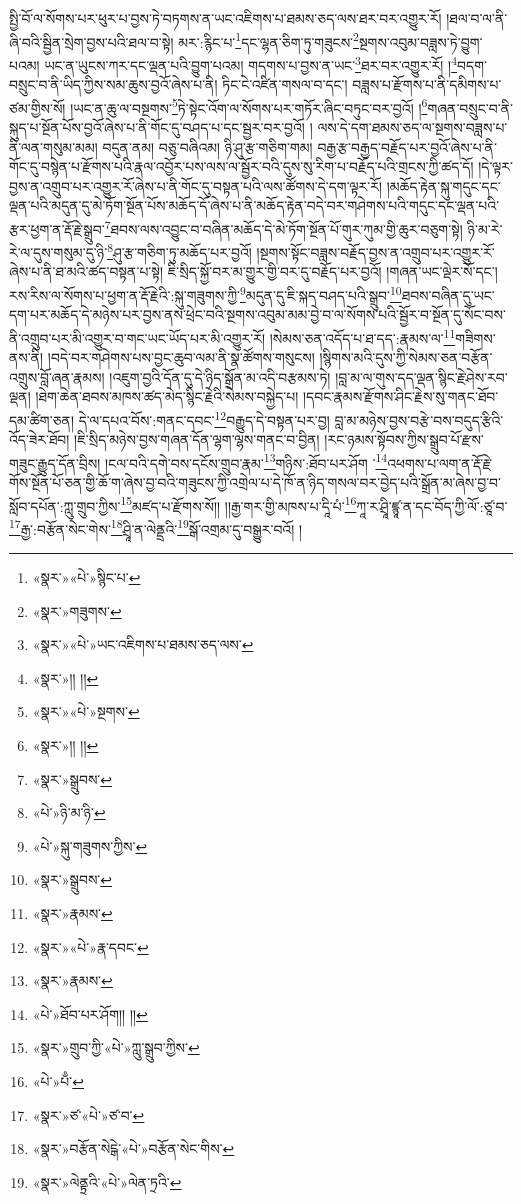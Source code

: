 སྤྱི་བོ་ལ་སོགས་པར་ཕུར་པ་བྱས་ཏེ་བཏགས་ན་ཡང་འཇིགས་པ་ཐམས་ཅད་ལས་ཐར་བར་འགྱུར་རོ། །ཐལ་བ་ལ་ནི་ཞི་བའི་སྦྱིན་སྲེག་བྱས་པའི་ཐལ་བ་སྟེ། མར་:རྙིང་པ་\footnote{«སྣར་»«པེ་»སྙིང་པ་}དང་ལྷན་ཅིག་ཏུ་གཟུངས་\footnote{«སྣར་»གཟུགས་}སྔགས་འབུམ་བཟླས་ཏེ་བྱུག་པའམ། ཡང་ན་ཡུངས་ཀར་དང་ལྡན་པའི་བྱུག་པའམ། གདགས་པ་བྱས་ན་ཡང་\footnote{«སྣར་»«པེ་»ཡང་འཇིགས་པ་ཐམས་ཅད་ལས་}ཐར་བར་འགྱུར་རོ། །\footnote{«སྣར་»།། །།}བདག་བསྲུང་བ་ནི་ཡིད་ཀྱིས་སམ་ཆུས་བྱའོ་ཞེས་པ་ནི། ཏིང་ངེ་འཛིན་གསལ་བ་དང་། བཟླས་པ་རྫོགས་པ་ནི་དམིགས་པ་ཙམ་གྱིས་སོ། །ཡང་ན་ཆུ་ལ་བསྔགས་\footnote{«སྣར་»«པེ་»སྔགས་}ཏེ་སྟེང་འོག་ལ་སོགས་པར་གཏོར་ཞིང་བཏུང་བར་བྱའོ། །\footnote{«སྣར་»།། །།}གཞན་བསྲུང་བ་ནི་སྐུད་པ་སྔོན་པོས་བྱའོ་ཞེས་པ་ནི་གོང་དུ་བཤད་པ་དང་སྦྱར་བར་བྱའོ། །
ལས་དེ་དག་ཐམས་ཅད་ལ་སྔགས་བཟླས་པ་ནི་ལན་གསུམ་མམ། བདུན་ནམ། བཅུ་བཞིའམ། ཉི་ཤུ་རྩ་གཅིག་གམ། བརྒྱ་རྩ་བརྒྱད་བརྗོད་པར་བྱའོ་ཞེས་པ་ནི་གོང་དུ་བསྙེན་པ་རྫོགས་པའི་རྣལ་འབྱོར་པས་ལས་ལ་སྦྱོར་བའི་དུས་སུ་རིག་པ་བརྗོད་པའི་གྲངས་ཀྱི་ཚད་དོ། །དེ་ལྟར་བྱས་ན་འགྲུབ་པར་འགྱུར་རོ་ཞེས་པ་ནི་གོང་དུ་བསྟན་པའི་ལས་ཚོགས་དེ་དག་ལྟར་རོ། །མཆོད་རྟེན་སྐུ་གདུང་དང་ལྡན་པའི་མདུན་དུ་མེ་ཏོག་སྔོན་པོས་མཆོད་དོ་ཞེས་པ་ནི་མཆོད་རྟེན་བདེ་བར་གཤེགས་པའི་གདུང་དང་ལྡན་པའི་རྩར་ཕྱག་ན་རྡོ་རྗེ་སྒྲུབ་\footnote{«སྣར་»སྒྲུབས་}ཐབས་ལས་འབྱུང་བ་བཞིན་མཆོད་དེ་མེ་ཏོག་སྔོན་པོ་གུར་ཀུམ་གྱི་ཆུར་བཅུག་སྟེ། ཉི་མ་རེ་རེ་ལ་དུས་གསུམ་དུ་ཉི་\footnote{«པེ་»ཉི་མ་ཉི་}ཤུ་རྩ་གཅིག་ཏུ་མཆོད་པར་བྱའོ། །སྔགས་སྟོང་བཟླས་བརྗོད་བྱས་ན་འགྲུབ་པར་འགྱུར་རོ་ཞེས་པ་ནི་ཐ་མའི་ཚད་བསྟན་པ་སྟེ། ཇི་སྲིད་སྐྱོ་བར་མ་གྱུར་གྱི་བར་དུ་བརྗོད་པར་བྱའོ། །གཞན་ཡང་ལྡེར་སོ་དང་། རས་རིས་ལ་སོགས་པ་ཕྱག་ན་རྡོ་རྗེའི་:སྐུ་གཟུགས་ཀྱི་\footnote{«པེ་»སྐུ་གཟུགས་ཀྱིས་}མདུན་དུ་ཇི་སྐད་བཤད་པའི་སྒྲུབ་\footnote{«སྣར་»སྒྲུབས་}ཐབས་བཞིན་དུ་ཡང་དག་པར་མཆོད་དེ་མཉེས་པར་བྱས་ནས་ཕྲེང་བའི་སྔགས་འབུམ་མམ་བྱེ་བ་ལ་སོགས་པའི་སྦྱོར་བ་སྔོན་དུ་སོང་བས་ནི་འགྲུབ་པར་མི་འགྱུར་བ་གང་ཡང་ཡོད་པར་མི་འགྱུར་རོ། །སེམས་ཅན་འདོད་པ་ཐ་དད་:རྣམས་ལ་\footnote{«སྣར་»རྣམས་}གཟིགས་ནས་ནི། །བདེ་བར་གཤེགས་པས་བྱང་ཆུབ་ལམ་ནི་སྣ་ཚོགས་གསུངས། །སྙིགས་མའི་དུས་ཀྱི་སེམས་ཅན་བརྩོན་འགྲུས་བློ་ཞན་རྣམས། །འཇུག་བྱའི་དོན་དུ་དེ་ཉིད་སྒྲོན་མ་འདི་བརྩམས་ཏེ། །བླ་མ་ལ་གུས་དད་ལྡན་སྙིང་རྗེ་ཤེས་རབ་ལྡན། །ཐེག་ཆེན་ཐབས་མཁས་ཚད་མེད་སྙིང་རྗེའི་སེམས་བསྐྱེད་པ། །དབང་རྣམས་རྫོགས་ཤིང་རྗེས་སུ་གནང་ཐོབ་དམ་ཚིག་ཅན། དེ་ལ་དཔའ་བོས་:གནང་དབང་\footnote{«སྣར་»«པེ་»རྣ་དབང་}བརྒྱུད་དེ་བསྟན་པར་བྱ། བླ་མ་མཉེས་བྱས་བརྩེ་བས་བདུད་རྩིའི་འོད་ཟེར་ཐོབ། །ཇི་སྲིད་མཉེས་བྱས་གཞན་དོན་ལྷག་ལྷས་གནང་བ་བྱིན། །རང་ཉམས་སྟོབས་ཀྱིས་སྒྲུབ་པོ་རྫས་གཟུང་རྒྱུད་དོན་བྲིས། །ངལ་བའི་དགེ་བས་དངོས་གྲུབ་རྣམ་\footnote{«སྣར་»རྣམས་}གཉིས་:ཐོབ་པར་ཤོག ་\footnote{«པེ་»ཐོབ་པར་ཤོག།། །།}འཕགས་པ་ལག་ན་རྡོ་རྗེ་གོས་སྔོན་པོ་ཅན་གྱི་ཆོ་ག་ཞེས་བྱ་བའི་གཟུངས་ཀྱི་འགྲེལ་པ་དེ་ཁོ་ན་ཉིད་གསལ་བར་བྱེད་པའི་སྒྲོན་མ་ཞེས་བྱ་བ་སློབ་དཔོན་:ཀླུ་གྲུབ་ཀྱིས་\footnote{«སྣར་»གྲུབ་ཀྱི་«པེ་»ཀླུ་སྒྲུབ་ཀྱིས་}མཛད་པ་རྫོགས་སོ།། །།རྒྱ་གར་གྱི་མཁས་པ་དཱི་པཾ་\footnote{«པེ་»པྃ་}ཀཱ་ར་ཤྲཱི་ཛྙཱ་ན་དང་བོད་ཀྱི་ལོ་:ཙཱ་བ་\footnote{«སྣར་»ཙ་«པེ་»ཙ་བ་}རྒྱ་:བརྩོན་སེང་གེས་\footnote{«སྣར་»བརྩོན་སེངྒེ་«པེ་»བརྩོན་སེང་གིས་}ཤྲཱི་ན་ལེནྡྲའི་\footnote{«སྣར་»ལེནྟྲའི་«པེ་»ལེན་ཏྲའི་}སྒོ་འགྲམ་དུ་བསྒྱུར་བའོ། ། 